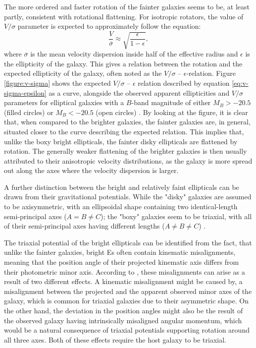 \documentclass[english, oneside]{HYgradu}
\begin{document}
The more ordered and faster rotation of the fainter galaxies seems to be, at least partly, consistent with rotational flattening. For isotropic rotators, the value of $V/\sigma$ parameter is expected to approximately follow the equation:
\begin{equation}
\frac{V}{\overline{\sigma}} \approx \sqrt{\frac{\epsilon}{1-\epsilon}}, \label{eq:v-sigma-epsilon}
\end{equation}
where $\overline{\sigma}$ is the mean velocity dispersion inside half of the effective radius and $\epsilon$ is the ellipticity of the galaxy. This gives a relation between the rotation and the expected ellipticity of the galaxy, often noted as the $V/\sigma$ – $\epsilon$-relation. Figure \ref{figure:v-sigma} shows the expected $V/\sigma$ – $\epsilon$ relation described by equation \ref{eq:v-sigma-epsilon} as a curve, alongside the observed apparent ellipticities and $V/\sigma$ parameters for elliptical galaxies with a $B$-band magnitude of either $M_B > -20.5$ (filled circles) or $M_B < -20.5$ (open circles) \citep{Davies1983}. By looking at the figure, it is clear that, when compared to the brighter galaxies, the fainter galaxies are, in general, situated closer to the curve describing the expected relation. This implies that, unlike the boxy bright ellipticals, the fainter disky ellipticals are flattened by rotation. The generally weaker flattening of the brighter galaxies is then usually attributed to their anisotropic velocity distributions, as the galaxy is more spread out along the axes where the velocity dispersion is larger.

A further distinction between the bright and relatively faint ellipticals can be drawn from their gravitational potentials. While the "disky" galaxies are assumed to be axisymmetric, with an ellipsoidal shape containing two identical-length semi-principal axes ($A = B \neq C$); the "boxy" galaxies seem to be triaxial, with all of their semi-principal axes having different lengths ($A \neq B \neq C$) \citep{GalaxyFormationAndEvo2010}. 

The triaxial potential of the bright ellipticals can be identified from the fact, that unlike the fainter galaxies, bright Es often contain kinematic misalignments, meaning that the position angle of their projected kinematic axis differs from their photometric minor axis. According to \cite{GalaxyFormationAndEvo2010}, these misalignments can arise as a result of two different effects. A kinematic misalignment might be caused by, a misalignment between the projected and the apparent observed minor axes of the galaxy, which is common for triaxial galaxies due to their asymmetric shape. On the other hand, the deviation in the position angles might also be the result of the observed galaxy having intrinsically misaligned angular momentum, which would be a natural consequence of triaxial potentials supporting rotation around all three axes. Both of these effects require the host galaxy to be triaxial.
\end{document}
